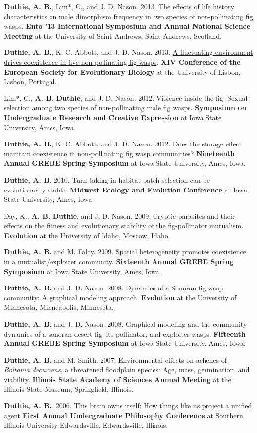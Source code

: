 \documentclass[letterpaper]{article}
\renewenvironment{itemize}{
  \begin{list}{}{
    \setlength{\leftmargin}{1.5em}
  }
}{
  \end{list}
}
\begin{document}
\begin{itemize}
\item {\bf Duthie, A. B.}, Lim*, C., and J. D. Nason. 2013. The effects of life history characteristics on male dimorphism frequency in two species of non-pollinating fig wasps. {\bf Ento '13 International Symposium and Annual National Science Meeting} at the University of Saint Andrews, Saint Andrews, Scotland.
\item {\bf Duthie, A. B.}, K. C. Abbott, and J. D. Nason. 2013. \href{https://www.youtube.com/watch?v=8Oi48FdaLXY}{A fluctuating environment drives coexistence in five non-pollinating fig wasps}. {\bf XIV Conference of the European Society for Evolutionary Biology} at the University of Lisbon, Lisbon, Portugal.
\item Lim*, C., {\bf A. B. Duthie}, and J. D. Nason. 2012. Violence inside the fig: Sexual selection among two species of non-pollinating male fig wasps. {\bf Symposium on Undergraduate Research and Creative Expression} at Iowa State University, Ames, Iowa.
\item {\bf Duthie, A. B.}, K. C. Abbott, and J. D. Nason. 2012. Does the storage effect maintain coexistence in non-pollinating fig wasp communities? {\bf Nineteenth Annual GREBE Spring Symposium} at Iowa State University, Ames, Iowa.
\item {\bf Duthie, A. B.} 2010. Turn-taking in habitat patch selection can be evolutionarily stable. {\bf Midwest Ecology and Evolution Conference} at Iowa State University, Ames, Iowa.
\item Day, K., {\bf A. B. Duthie}, and J. D. Nason. 2009. Cryptic parasites and their effects on the fitness and evolutionary stability of the fig-pollinator mutualism. {\bf Evolution} at the University of Idaho, Moscow, Idaho.
\item {\bf Duthie, A. B.} and M. Falcy. 2009. Spatial heterogeneity promotes coexistence in a mutualist/exploiter community. {\bf Sixteenth Annual GREBE Spring Symposium} at Iowa State University, Ames, Iowa.
\item {\bf Duthie, A. B.} and J. D. Nason. 2008. Dynamics of a Sonoran fig wasp community: A graphical modeling approach. {\bf Evolution} at the University of Minnesota, Minneapolis, Minnesota.
\item {\bf Duthie, A. B.} and J. D. Nason. 2008. Graphical modeling and the community dynamics of a sonoran desert fig, its pollinator, and exploiter wasps. {\bf Fifteenth Annual GREBE Spring Symposium} at Iowa State University, Ames, Iowa.
\item {\bf Duthie, A. B.} and M. Smith. 2007. Environmental effects on achenes of {\it Boltonia decurrens}, a threatened floodplain species: Age, mass, germination, and viability. {\bf Illinois State Academy of Sciences Annual Meeting} at the Illinois State Museum, Springfield, Illinois.
\item {\bf Duthie, A. B.}. 2006. This brain owns itself: How things like us project a unified agent {\bf First Annual Undergraduate Philosophy Conference} at Southern Illinois University Edwardsville, Edwardsville, Illinois.
\end{itemize}
\end{document}
